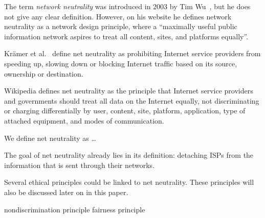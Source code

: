 
The term \emph{network neutrality} was introduced in 2003 by Tim Wu~\cite{wu2003network}, but he does not give any clear definition. However, on his website \highlight{[cite]} he defines network neutrality as a network design principle, where a ``maximally useful public information network aspires to treat all content, sites, and platforms equally''.

Kr\"amer et al.~\cite{kramer2013net} define net neutrality as prohibiting Internet service providers from speeding up, slowing down or blocking Internet trafﬁc based on its source, ownership or destination.

Wikipedia defines net neutrality as the principle that Internet service providers and governments should treat all data on the Internet equally, not discriminating or charging differentially by user, content, site, platform, application, type of attached equipment, and modes of communication.

We define net neutrality as \ldots

The goal of net neutrality already lies in its definition: detaching \acp{ISP} from the information that is sent through their networks.

Several ethical principles could be linked to net neutrality. These principles will also be discussed later on in this paper.

 nondiscrimination principle
 fairness principle
